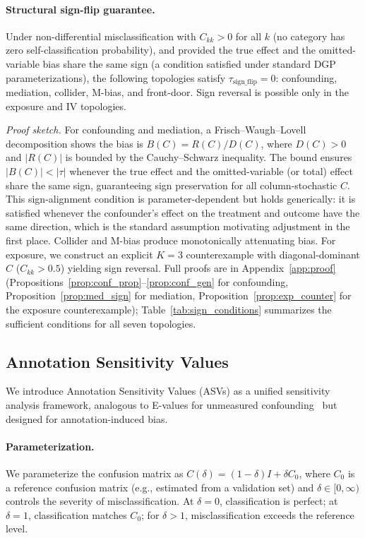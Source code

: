 \paragraph{Structural sign-flip guarantee.}
\begin{proposition}
\label{prop:signflip}
Under non-differential misclassification with $C_{kk} > 0$ for all $k$ (no category has zero self-classification probability), and provided the true effect and the omitted-variable bias share the same sign (a condition satisfied under standard DGP parameterizations), the following topologies satisfy $\tau_{\text{sign\_flip}} = 0$: confounding, mediation, collider, M-bias, and front-door. Sign reversal is possible only in the exposure and IV topologies.
\end{proposition}

\emph{Proof sketch.}
For confounding and mediation, a Frisch--Waugh--Lovell decomposition shows the bias is $B(C) = R(C)/D(C)$, where $D(C)>0$ and $|R(C)|$ is bounded by the Cauchy--Schwarz inequality. The bound ensures $|B(C)| < |\tau|$ whenever the true effect and the omitted-variable (or total) effect share the same sign, guaranteeing sign preservation for all column-stochastic $C$. This sign-alignment condition is parameter-dependent but holds generically: it is satisfied whenever the confounder's effect on the treatment and outcome have the same direction, which is the standard assumption motivating adjustment in the first place. Collider and M-bias produce monotonically attenuating bias. For exposure, we construct an explicit $K{=}3$ counterexample with diagonal-dominant $C$ ($C_{kk}{>}0.5$) yielding sign reversal. Full proofs are in Appendix~\ref{app:proof} (Propositions~\ref{prop:conf_prop}--\ref{prop:conf_gen} for confounding, Proposition~\ref{prop:med_sign} for mediation, Proposition~\ref{prop:exp_counter} for the exposure counterexample); Table~\ref{tab:sign_conditions} summarizes the sufficient conditions for all seven topologies.

\subsection{Annotation Sensitivity Values}
\label{sec:asv}

We introduce Annotation Sensitivity Values (ASVs) as a unified sensitivity analysis framework, analogous to E-values for unmeasured confounding~\cite{vanderweele_ding2017} but designed for annotation-induced bias.

\paragraph{Parameterization.}
We parameterize the confusion matrix as $C(\delta) = (1{-}\delta)I + \delta C_0$, where $C_0$ is a reference confusion matrix (e.g., estimated from a validation set) and $\delta \in [0, \infty)$ controls the severity of misclassification. At $\delta{=}0$, classification is perfect; at $\delta{=}1$, classification matches $C_0$; for $\delta{>}1$, misclassification exceeds the reference level.

